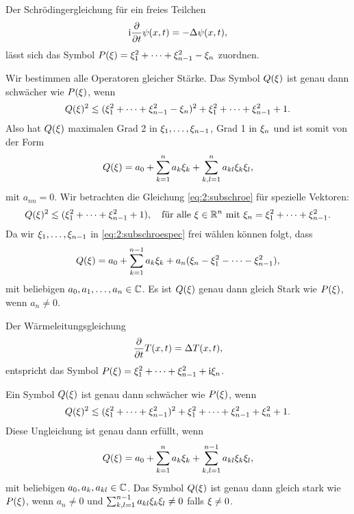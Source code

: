 \begin{exa}\label{exa:2:schroe}
Der Schrödingergleichung für ein freies Teilchen
\begin{equation}
\mathrm i\frac{\partial}{\partial t}\psi(x,t)=-\Delta\psi(x,t),\end{equation}
lässt sich das Symbol $P(\xi)=\xi^2_1+\dots+\xi^2_{n-1}-\xi_n$ zuordnen.

Wir bestimmen alle Operatoren gleicher Stärke.
Das Symbol $Q(\xi)$ ist genau dann schwächer wie $P(\xi)$,
wenn
\begin{equation}\label{eq:2:subschroe}
Q(\x)^2\apprle(\x^2_1+\dots+\x^2_{n-1}-\x_n)^2+\x^2_1+\dots+\x^2_{n-1}+1.
\end{equation}
Also hat $Q(\xi)$ maximalen Grad 2 in $\xi_1,\dots,\xi_{n-1}$,
Grad 1 in $\xi_n$ und ist somit von der Form
\begin{equation}
Q(\xi)=a_0+\sum^n_{k=1}a_k\xi_k+\sum^n_{k,l=1}a_{kl}\xi_k\xi_l,
\end{equation}
mit $a_{nn}=0$.
Wir betrachten die Gleichung \eqref{eq:2:subschroe}
für spezielle Vektoren:
\begin{equation}\label{eq:2:subschroespec}
Q(\x)^2\apprle(\x^2_1+\dots+\x^2_{n-1}+1),
\quad\text{für alle}~\x\in\R^n~\text{mit}~\x_n=\x^2_1+\dots+\x^2_{n-1}.
\end{equation}
Da wir $\xi_1,\dots,\xi_{n-1}$ in \eqref{eq:2:subschroespec} frei wählen können folgt, dass
\begin{equation}
Q(\xi)=a_0+\sum_{k=1}^{n-1}a_k\xi_k+a_n(\xi_n-\xi^2_1-\dots-\xi^2_{n-1}),
\end{equation}
mit beliebigen $a_0,a_1,\dots,a_n\in\mathbb C$.
Es ist $Q(\xi)$ genau dann gleich Stark wie $P(\xi)$,
wenn $a_n\neq0$.
\end{exa}

\begin{exa}\label{exa:2:heat}
Der Wärmeleitungsgleichung
\begin{equation}
\frac{\partial}{\partial t}T(x,t)=\Delta T(x,t),
\end{equation}
entspricht das Symbol $P(\xi)=\xi^2_1+\dots+\xi^2_{n-1}+\mathrm i\xi_n$.

Ein Symbol $Q(\xi)$ ist genau dann schwächer wie $P(\xi)$, wenn
\begin{equation}
Q(\x)^2\apprle(\x^2_1+\dots+\x^2_{n-1})^2+\x^2_1+\dots+\x^2_{n-1}+\x^2_n+1.
\end{equation}
Diese Ungleichung ist genau dann erfüllt, wenn
\begin{equation}
Q(\xi)=a_0+\sum_{k=1}^na_k\xi_k+\sum_{k,l=1}^{n-1}a_{kl}\xi_k\xi_l,
\end{equation}
mit beliebigen $a_0,a_k,a_{kl}\in\mathbb C$.
Das Symbol $Q(\xi)$ ist genau dann gleich stark wie $P(\xi)$,
wenn $a_n\neq0$ und $\sum_{k,l=1}^{n-1}a_{kl}\xi_k\xi_l\neq0$ falls $\xi\neq0$.
\end{exa}

